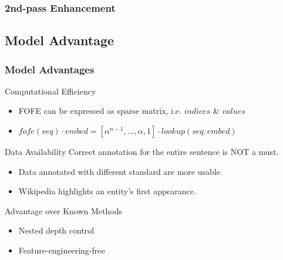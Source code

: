 \documentclass{beamer}
\begin{document}
\begin{frame}
\frametitle{2nd-pass Enhancement}
\begin{figure}
	\centering
\end{figure}
\end{frame}


\subsection{Model Advantage}

\begin{frame}
\frametitle{Model Advantages}
\small
\begin{block}{Computational Efficiency}
	\begin{itemize}
		\item FOFE can be expressed as sparse matrix, i.e. $indices$ \& $values$
		\item $fofe(seq) \cdot embed = 
				[\alpha^{n-1}, ..., \alpha, 1] \cdot lookup(seq, embed)$
	\end{itemize}
\end{block}
\begin{block}{Data Availability}
	Correct annotation for the entire sentence is NOT a must.
	\begin{itemize}
		\item Data annotated with different standard are more usable.
		\item Wikipedia highlights an entity's first appearance.{\scriptsize\parencite{nothman2013learning}}
	\end{itemize}
\end{block}
\begin{alertblock}{Advantage over Known Methods}
	\begin{itemize}
		\item Nested depth control
		\item Feature-engineering-free
	\end{itemize}
\end{alertblock}
\end{frame}
\end{document}
